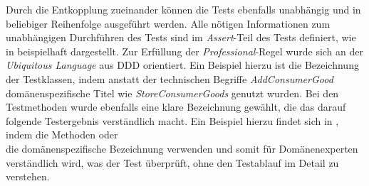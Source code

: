Durch die Entkopplung zueinander können die Tests ebenfalls unabhängig und in beliebiger Reihenfolge ausgeführt werden.
Alle nötigen Informationen zum unabhängigen Durchführen des Tests sind im \textit{Assert}-Teil des Tests definiert, wie in \href{https://github.com/lucasmerkel/dhbw-advancedswe-programmentwurf/blob/5764d7da4cfd0562ed8e96128e92f85c30b7309d/swe_programmentwurf/consumergoods-inventory-planner/0-cip-plugins/src/test/java/de/dhbw/cip/DateValidationTest.java}{} beispielhaft dargestellt.
Zur Erfüllung der \textit{Professional}-Regel wurde sich an der \textit{Ubiquitous Language} aus \ac{DDD} orientiert. Ein Beispiel hierzu ist die Bezeichnung der Testklassen, indem anstatt der technischen Begriffe \textit{AddConsumerGood} domänenspezifische Titel wie \textit{StoreConsumerGoods} genutzt wurden.
Bei den Testmethoden wurde ebenfalls eine klare Bezeichnung gewählt, die das darauf folgende Testergebnis verständlich macht.
Ein Beispiel hierzu findet sich in \href{https://github.com/lucasmerkel/dhbw-advancedswe-programmentwurf/blob/5764d7da4cfd0562ed8e96128e92f85c30b7309d/swe_programmentwurf/consumergoods-inventory-planner/0-cip-plugins/src/test/java/de/dhbw/cip/StoreConsumerGoodsTest.java}{}, indem die Methoden \href{https://github.com/lucasmerkel/dhbw-advancedswe-programmentwurf/blob/5764d7da4cfd0562ed8e96128e92f85c30b7309d/swe_programmentwurf/consumergoods-inventory-planner/0-cip-plugins/src/test/java/de/dhbw/cip/StoreConsumerGoodsTest.java#L13}{} oder \\\href{https://github.com/lucasmerkel/dhbw-advancedswe-programmentwurf/blob/5764d7da4cfd0562ed8e96128e92f85c30b7309d/swe_programmentwurf/consumergoods-inventory-planner/0-cip-plugins/src/test/java/de/dhbw/cip/StoreConsumerGoodsTest.java#L26}{} die domänenspezifische Bezeichnung verwenden und somit für Domänenexperten verständlich wird, was der Test überprüft, ohne den Testablauf im Detail zu verstehen.

